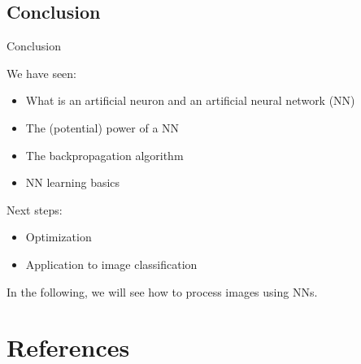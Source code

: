 \documentclass[handout,xcolor=pdftex,dvipsnames,table,mathserif]{beamer}
\begin{document}


\subsection{Conclusion}


\begin{frame}{Conclusion}

  We have seen:
  \begin{itemize}
  \item What is an artificial neuron and an artificial neural network (NN)
  \item The (potential) power of a NN
  \item The backpropagation algorithm
  \item NN learning basics
  \end{itemize}

  Next steps:
  \begin{itemize}
    \item Optimization
    \item Application to image classification
  \end{itemize}

In the following, we will see how to process images using NNs.

\end{frame}


\section*{References}



\end{document}
